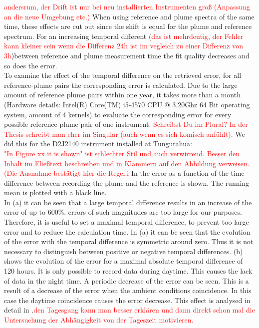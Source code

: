 \textcolor{red}{andersrum, der Drift ist nur bei neu installierten Instrumenten groß (Anpassung an die neue Umgebung etc.)}
When using reference and plume spectra of the same time, these effects are cut out since the shift is equal for the plume and reference spectrum.
For an increasing temporal different (\textcolor{red}{das ist mehrdeutig, der Fehler kann kleiner sein wenn die Differenz 24h ist im vegleich zu einer Differenz von 3h})between reference and plume measurement time the fit quality decreases and so does the  error.\\
To examine the effect of the temporal difference on the retrieved  error, for all reference-plume pairs the corresponding  error is calculated. Due to the large amount of reference plume pairs within one year, it takes more than a month (Hardware details: Intel(R) Core(TM) i5-4570 CPU @ 3.20Ghz 64 Bit operating system, amount of 4 kernels) to evaluate the corresponding  error for every possible reference-plume pair of one instrument. \textcolor{red}{Schreibst Du im Plural? In der Thesis schreibt man eher im Singular (auch wenn es sich komisch anfühlt).} We did this for the  D2J2140 instrument installed at Tungurahua:\\
\textcolor{red}{"In Figure xx it is shown" ist schlechter Stil und auch verwirrend. Besser den Inhalt im Fließtext beschreiben und in Klammern auf den Abbildung verweisen. (Die Ausnahme bestätigt hier die Regel.^^)}
In  the  error as a function of the time difference between recording the plume and the reference is shown. The running mean is plotted with a black line. \\
In  (a) it can be seen that a large temporal difference results in an increase of the   error of up to 600\%.  errors of such magnitudes are too large for our purposes. Therefore, it is useful to set a maximal temporal difference, to prevent too large  error and to reduce the calculation time.
%
In  (a) it can be seen that the evolution of the   error with the temporal difference is symmetric around zero. Thus it is not necessary to distinguish between positive or negative temporal differences.
%
 (b) shows the evolution of the  error for a maximal absolute temporal difference of 120 hours. It is only possible to record data during daytime. This causes the lack of data in the night time. A periodic decrease of the  error can be seen. This is a result of a decrease of the  error when the ambient conditions coincidence. In this case the daytime coincidence causes the   error decrease. This effect is analysed in detail in .\textcolor{red}{den Tagesgang kann man besser erklären und dann direkt schon mal die Untersuchung der Abhängigkeit von der Tageszeit motivieren.}\\

